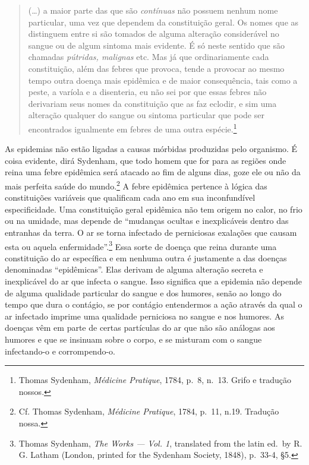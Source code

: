\begin{quote}
(\ldots{}) a maior parte das que são \textit{contínuas} não possuem nenhum
nome particular, uma vez que dependem da constituição geral. Os nomes
que as distinguem entre si são tomados de alguma alteração considerável
no sangue ou de algum sintoma mais evidente. É só neste sentido que são
chamadas \textit{pútridas, malignas} etc. Mas já que ordinariamente cada
constituição, além das febres que provoca, tende a provocar ao mesmo
tempo outra doença mais epidêmica e de maior consequência, tais como a
peste, a varíola e a disenteria, eu não sei por que essas febres não
derivariam seus nomes da constituição que as faz eclodir, e sim uma
alteração qualquer do sangue ou sintoma particular que pode ser
encontrados igualmente em febres de uma outra espécie.\footnote{Thomas
  Sydenham, \textit{Médicine Pratique}, 1784, p.~8, n.~13. Grifo e
  tradução nossos.}
\end{quote}

As epidemias não estão ligadas a causas mórbidas produzidas pelo
organismo. É coisa evidente, dirá Sydenham, que todo homem que for para
as regiões onde reina uma febre epidêmica será atacado ao fim de alguns
dias, goze ele ou não da mais perfeita saúde do mundo.\footnote{Cf.
  Thomas Sydenham, \textit{Médicine Pratique}, 1784, p.~11, n.19. Tradução
  nossa.} A febre epidêmica pertence à lógica das constituições
variáveis que qualificam cada ano em sua inconfundível especificidade.
Uma constituição geral epidêmica não tem origem no calor, no frio ou na
umidade, mas depende de ``mudanças ocultas e inexplicáveis dentro das
entranhas da terra. O ar se torna infectado de perniciosas exalações que
causam esta ou aquela enfermidade''.\footnote{Thomas Sydenham, \textit{The
  Works --- Vol. 1}, translated from the latin ed.~by R. G. Latham
  (London, printed for the Sydenham Society, 1848), p.~33-4, §5.} Essa
sorte de doença que reina durante uma constituição do ar específica e em
nenhuma outra é justamente a das doenças denominadas ``epidêmicas''.
Elas derivam de alguma alteração secreta e inexplicável do ar que
infecta o sangue. Isso significa que a epidemia não depende de alguma
qualidade particular do sangue e dos humores, senão ao longo do tempo
que dura o contágio, se por contágio entendermos a ação através da qual
o ar infectado imprime uma qualidade perniciosa no sangue e nos humores.
As doenças vêm em parte de certas partículas do ar que não são análogas
aos humores e que se insinuam sobre o corpo, e se misturam com o sangue
infectando-o e corrompendo-o.

